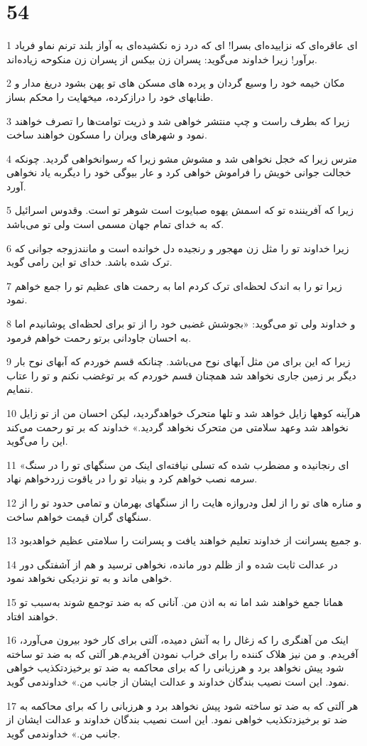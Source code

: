 \chapter{54}

\par 1 ای عاقره‌ای که نزاییده‌ای بسرا! ای که درد زه نکشیده‌ای به آواز بلند ترنم نماو فریاد برآور! زیرا خداوند می‌گوید: پسران زن بیکس از پسران زن منکوحه زیاده‌اند.
\par 2 مکان خیمه خود را وسیع گردان و پرده های مسکن های تو پهن بشود دریغ مدار و طنابهای خود را درازکرده، میخهایت را محکم بساز.
\par 3 زیرا که بطرف راست و چپ منتشر خواهی شد و ذریت توامت‌ها را تصرف خواهند نمود و شهرهای ویران را مسکون خواهند ساخت.
\par 4 مترس زیرا که خجل نخواهی شد و مشوش مشو زیرا که رسوانخواهی گردید. چونکه خجالت جوانی خویش را فراموش خواهی کرد و عار بیوگی خود را دیگربه یاد نخواهی آورد.
\par 5 زیرا که آفریننده تو که اسمش یهوه صبایوت است شوهر تو است. وقدوس اسرائیل که به خدای تمام جهان مسمی است ولی تو می‌باشد.
\par 6 زیرا خداوند تو را مثل زن مهجور و رنجیده دل خوانده است و مانندزوجه جوانی که ترک شده باشد. خدای تو این رامی گوید.
\par 7 زیرا تو را به اندک لحظه‌ای ترک کردم اما به رحمت های عظیم تو را جمع خواهم نمود.
\par 8 و خداوند ولی تو می‌گوید: «بجوشش غضبی خود را از تو برای لحظه‌ای پوشانیدم اما به احسان جاودانی برتو رحمت خواهم فرمود.
\par 9 زیرا که این برای من مثل آبهای نوح می‌باشد. چنانکه قسم خوردم که آبهای نوح بار دیگر بر زمین جاری نخواهد شد همچنان قسم خوردم که بر توغضب نکنم و تو را عتاب ننمایم.
\par 10 هرآینه کوهها زایل خواهد شد و تلها متحرک خواهدگردید، لیکن احسان من از تو زایل نخواهد شد وعهد سلامتی من متحرک نخواهد گردید.» خداوند که بر تو رحمت می‌کند این را می‌گوید.
\par 11 «ای رنجانیده و مضطرب شده که تسلی نیافته‌ای اینک من سنگهای تو را در سنگ سرمه نصب خواهم کرد و بنیاد تو را در یاقوت زردخواهم نهاد.
\par 12 و مناره های تو را از لعل ودروازه هایت را از سنگهای بهرمان و تمامی حدود تو را از سنگهای گران قیمت خواهم ساخت.
\par 13 و جمیع پسرانت از خداوند تعلیم خواهند یافت و پسرانت را سلامتی عظیم خواهدبود.
\par 14 در عدالت ثابت شده و از ظلم دور مانده، نخواهی ترسید و هم از آشفتگی دور خواهی ماند و به تو نزدیکی نخواهد نمود.
\par 15 همانا جمع خواهند شد اما نه به اذن من. آنانی که به ضد توجمع شوند به‌سبب تو خواهند افتاد.
\par 16 اینک من آهنگری را که زغال را به آتش دمیده، آلتی برای کار خود بیرون می‌آورد، آفریدم. و من نیز هلاک کننده را برای خراب نمودن آفریدم.هر آلتی که به ضد تو ساخته شود پیش نخواهد برد و هرزبانی را که برای محاکمه به ضد تو برخیزدتکذیب خواهی نمود. این است نصیب بندگان خداوند و عدالت ایشان از جانب من.» خداوندمی گوید.
\par 17 هر آلتی که به ضد تو ساخته شود پیش نخواهد برد و هرزبانی را که برای محاکمه به ضد تو برخیزدتکذیب خواهی نمود. این است نصیب بندگان خداوند و عدالت ایشان از جانب من.» خداوندمی گوید.
 
